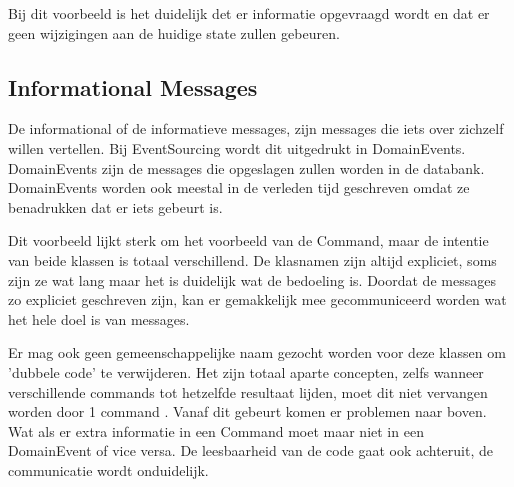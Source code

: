 
Bij dit voorbeeld is het duidelijk det er informatie opgevraagd wordt en dat er geen wijzigingen aan de huidige state zullen gebeuren.

\subsection{Informational Messages}
\label{subsec:informational-messages}

De informational of de informatieve messages, zijn messages die iets over zichzelf willen vertellen. Bij EventSourcing wordt dit uitgedrukt in DomainEvents. DomainEvents zijn de messages die opgeslagen zullen worden in de databank. DomainEvents worden ook meestal in de verleden tijd geschreven omdat ze benadrukken dat er iets gebeurt is.


Dit voorbeeld lijkt sterk om het voorbeeld van de Command, maar de intentie van beide klassen is totaal verschillend. De klasnamen zijn altijd expliciet, soms zijn ze wat lang maar het is duidelijk wat de bedoeling is. Doordat de messages zo expliciet geschreven zijn, kan er gemakkelijk mee gecommuniceerd worden wat het hele doel is van messages.

Er mag ook geen gemeenschappelijke naam gezocht worden voor deze klassen om 'dubbele code' te verwijderen. Het zijn totaal aparte concepten, zelfs wanneer verschillende commands tot hetzelfde resultaat lijden, moet dit niet vervangen worden door 1 command \autocite{Verraes2014DDDLinguistic}. Vanaf dit gebeurt komen er problemen naar boven. Wat als er extra informatie in een Command moet maar niet in een DomainEvent of vice versa. De leesbaarheid van de code gaat ook achteruit, de communicatie wordt onduidelijk.
